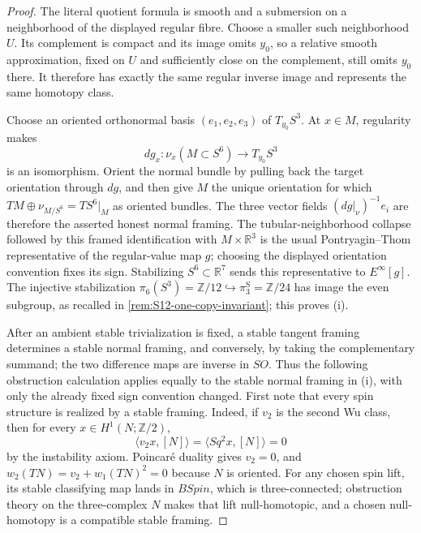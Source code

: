 \documentclass[11pt,letterpaper]{article}
\numberwithin{equation}{section}
\theoremstyle{definition}
\theoremstyle{remark}
\newcommand{\R}{\mathbb R}
\newcommand{\Z}{\mathbb Z}
\begin{document}
\begin{proof}
The literal quotient formula is smooth and a submersion on a neighborhood
of the displayed regular fibre.  Choose a smaller such neighborhood \(U\).
Its complement is compact and its image omits \(y_0\), so a relative smooth
approximation, fixed on \(U\) and sufficiently close on the complement,
still omits \(y_0\) there.  It therefore has exactly the same regular
inverse image and represents the same homotopy class.

Choose an oriented orthonormal basis
\((e_1,e_2,e_3)\) of \(T_{y_0}S^3\).  At \(x\in M\), regularity makes
\[
 dg_x:\nu_x(M\subset S^6)\longrightarrow T_{y_0}S^3
\]
is an isomorphism.  Orient the normal bundle by pulling back the target
orientation through \(dg\), and then give \(M\) the unique orientation for
which \(TM\oplus\nu_{M/S^6}=TS^6|_M\) as oriented bundles.  The three vector fields
\((dg|_\nu)^{-1}e_i\) are therefore the asserted honest normal framing.
The tubular-neighborhood collapse followed by this framed identification
with \(M\times\R^3\) is the usual Pontryagin--Thom representative of the
regular-value map \(g\); choosing the displayed orientation convention
fixes its sign.  Stabilizing \(S^6\subset\R^7\) sends this representative
to \(E^\infty[g]\).  The injective stabilization
\(\pi_6(S^3)=\Z/12\hookrightarrow\pi_3^{\mathrm S}=\Z/24\) has image the
even subgroup, as recalled in
\cref{rem:S12-one-copy-invariant}; this proves (i).

After an ambient stable trivialization is fixed, a stable tangent framing
determines a stable normal framing, and conversely, by taking the
complementary summand; the two difference maps are inverse in \(SO\).
Thus the following obstruction calculation applies equally to the stable
normal framing in (i), with only the already fixed sign convention changed.
First note that every spin structure is realized by a stable framing.
Indeed, if \(v_2\) is the second Wu class, then for every
\(x\in H^1(N;\Z/2)\),
\[
 \langle v_2x,[N]\rangle=\langle Sq^2x,[N]\rangle=0
\]
by the instability axiom.  Poincar\'e duality gives \(v_2=0\), and
\(w_2(TN)=v_2+w_1(TN)^2=0\) because \(N\) is oriented.  For any chosen
spin lift, its stable classifying map lands in \(BSpin\), which is
three-connected; obstruction theory on the three-complex \(N\) makes
that lift null-homotopic, and a chosen null-homotopy is a compatible
stable framing.


\end{proof}
\end{document}

